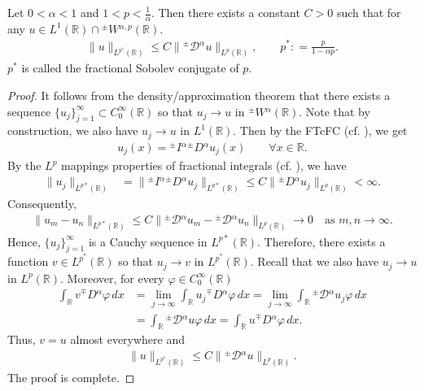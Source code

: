 \documentclass[leqno,final]{siamltex}
\numberwithin{equation}{section}
\renewcommand{\(}{\bigl(}
\renewcommand{\)}{\bigr)}
\newcommand{\R}{\mathbb{R}}
\begin{document}
   
   \begin{theorem}\label{thm_Sobolev_inq}
   	Let $0<\alpha<1$ and $1 <  p < \frac{1}{\alpha}$. Then there exists a constant $C >0$ such that for any $u\in L^1(\R) \cap {^{\pm}}{W}{^{\alpha,p}}(\R)$.
   	\begin{align}\label{SobolevInequalityR}
   	\|u\|_{L^{p^*}(\R)} \leq C \|{^{\pm}}{\mathcal{D}}{^{\alpha}} u\|_{L^{p}(\R)}, \qquad p^* : = \frac{p}{1-\alpha p}.
   	\end{align}
   	$p^*$ is called the fractional Sobolev conjugate of $p$. 
   \end{theorem}
   
   \begin{proof}
   	It follows from the density/approximation theorem that there exists a sequence $\{ u_j \}_{j =  1}^{\infty} \subset C^{\infty}_{0}(\R)$ so that $u_j\rightarrow u$ in ${^{\pm}}{W}{^{\alpha}}(\R)$. Note that by 
   	construction, we also have $u_j \rightarrow u$ in $L^{1}(\R)$. Then by the 
   	FTcFC (cf. \cite[Theorem 3.2]{Feng_Sutton}), we get
   	\begin{align*}
   	u_j(x) = {^{\pm}}{I}{^{\alpha}} {^{\pm}}{D}{^{\alpha}} u_j(x)\qquad \forall x \in \R.
   	\end{align*}
   	By the $L^{p}$ mappings properties of fractional integrals 
   	(cf. \cite[Theorem 2.6]{Feng_Sutton}), we have
   	\begin{align*}
   	 \|u_j\|_{L^{p*}(\R)} &=  \|{^{\pm}}{I}{^{\alpha}} {^{\pm}}{D}{^{\alpha}} u_j \|_{L^{p*}(\R)}
   	\leq  C \|{^{\pm}}{D}{^{\alpha}} u_j \|_{L^{p}(\R)}
   	< \infty.
   	\end{align*}
   	Consequently,
   	\begin{align*}
   	\|u_m - u_n \|_{L^{p*}(\R)} \leq C \| {^{\pm}}{\mathcal{D}}{^{\alpha}} u_m - {^{\pm}}{\mathcal{D}}{^{\alpha}} u_n \|_{L^{p}(\R)} \to 0 \quad\mbox{as } m,n\to \infty.
   	\end{align*}
   	Hence, $\{u_j\}_{j=1}^{\infty}$ is a Cauchy sequence in $L^{p*}(\R)$. Therefore, there exists 
   	a function  $v \in L^{p^*}(\R)$ so that $u_j \rightarrow v$ in $L^{p^*}(\R)$.
   	Recall that we also have $u_j \rightarrow u$ in $L^{p}(\R)$. Moreover, 
   	for every $\varphi \in C^{\infty}_{0}(\R)$ 
   	\begin{align*}
   	\int_{\R} v {^{\mp}}{D}{^{\alpha}}\varphi\,dx &= \lim_{j \rightarrow \infty} \int_{\R} u_j {^{\mp}}{D}{^{\alpha}} \varphi \, dx
   	= \lim_{j \rightarrow \infty} \int_{\R} {^{\pm}}{\mathcal{D}}{^{\alpha}} u_j \varphi \,dx \\
   	&= \int_{\R} {^{\pm}}{\mathcal{D}}{^{\alpha}} u \varphi \, dx
   	= \int_{\R} u {^{\mp}}{D}{^{\alpha}} \varphi\, dx.
   	\end{align*}
   	Thus, $v=u$ almost everywhere and 
   	\begin{align*}
   	\|u \|_{L^{p^*}(\R)} \leq C \| {^{\pm}}{\mathcal{D}}{^{\alpha}} u\|_{L^p(\R)}.
   	\end{align*}
   	The proof is complete. 
   \end{proof}
   
\end{document}
